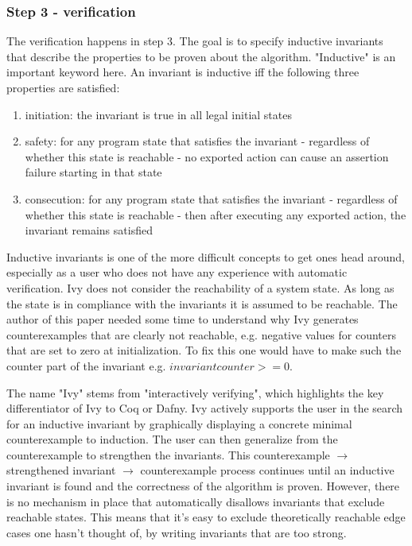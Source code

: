 \documentclass[fleqn]{article}
\begin{document}
\subsubsection{Step 3 - verification}
The verification happens in step 3. The goal is to specify inductive invariants that describe the properties to be proven about the algorithm. "Inductive" is an important
keyword here. An invariant is inductive iff the following three properties are satisfied:
\begin{enumerate}
  \item initiation: the invariant is true in all legal initial states
  \item safety: for any program state that satisfies the invariant - regardless of whether this state is reachable - no exported action can cause an assertion failure starting in that state
  \item consecution: for any program state that satisfies the invariant - regardless of whether this state is reachable - then after executing any exported action, the invariant remains satisfied
\end{enumerate}
Inductive invariants is one of the more difficult concepts to get ones head around, especially as a user who does not have any experience with automatic verification.
Ivy does not consider the reachability of a system state.  As long as the state is in compliance with the invariants it is assumed to be reachable.
The author of this paper needed some time to understand why Ivy generates counterexamples that are clearly not reachable, e.g. negative values for counters that are set to zero at initialization.
To fix this one would have to make such the counter part of the invariant e.g. $invariant counter >= 0$.

The name "Ivy" stems from "interactively verifying", which highlights the key differentiator of Ivy to Coq or Dafny.
Ivy actively supports the user in the search for an inductive invariant by graphically displaying a concrete minimal counterexample to induction.
The user can then generalize from the counterexample to strengthen the invariants. This counterexample $\rightarrow$ strengthened invariant $\rightarrow$ counterexample process continues
until an inductive invariant is found and the correctness of the algorithm is proven. However, there is no mechanism in place that automatically disallows invariants that exclude reachable states.
This means that it's easy to exclude theoretically reachable edge cases one hasn't thought of, by writing invariants that are too strong.
\end{document}
